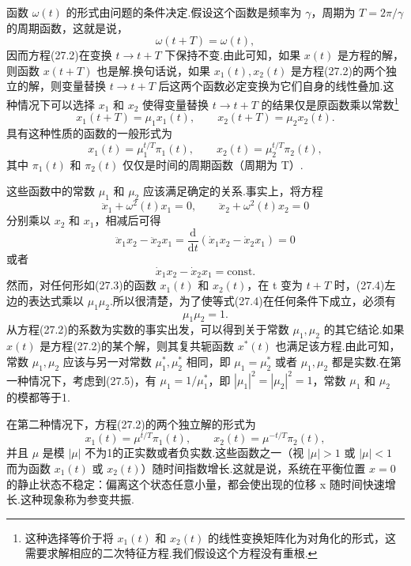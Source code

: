 函数 $\omega(t)$ 的形式由问题的条件决定.假设这个函数是频率为 $\gamma$，周期为 $T=2\pi/\gamma$ 的周期函数，这就是说，
\begin{equation*}
  \omega(t+T)=\omega(t),
\end{equation*}
因而方程(27.2)在变换 $t\to t+T$ 下保持不变.由此可知，如果 $x(t)$ 是方程的解，则函数 $x(t+T)$ 也是解.换句话说，如果 $x_1(t),x_2(t)$ 是方程(27.2)的两个独立的解，则变量替换 $t\to t+T$ 后这两个函数必定变换为它们自身的线性叠加.这种情况下可以选择 $x_1$ 和 $x_2$ 使得变量替换 $t\to t+T$ 的结果仅是原函数乘以常数\footnote{这种选择等价于将 $x_1(t)$ 和 $x_2(t)$ 的线性变换矩阵化为对角化的形式，这需要求解相应的二次特征方程.我们假设这个方程没有重根.}
\begin{equation*}
  x_1(t+T)=\mu_1x_1(t),\qquad
  x_2(t+T)=\mu_2x_2(t).
\end{equation*}
具有这种性质的函数的一般形式为
\begin{equation}
  x_1(t)=\mu_1^{t/T}\pi_1(t),\qquad
  x_2(t)=\mu_2^{t/T}\pi_2(t),
\end{equation}
其中 $\pi_1(t)$ 和 $\pi_2(t)$ 仅仅是时间的周期函数（周期为 T）.

这些函数中的常数 $\mu_1$ 和 $\mu_2$ 应该满足确定的关系.事实上，将方程
\begin{equation*}
  \ddot{x}_1+\omega^2(t)x_1=0,\qquad
  \ddot{x}_2+\omega^2(t)x_2=0
\end{equation*}
分别乘以 $x_2$ 和 $x_1$，相减后可得
\begin{equation*}
  \ddot{x}_1x_2-\ddot{x}_2x_1
  =\frac{\mathrm{d}}{\mathrm{d}t}\left(\dot{x}_1x_2-\dot{x}_2x_1\right)=0
\end{equation*}
或者
\begin{equation}
  \dot{x}_1x_2-\dot{x}_2x_1=\mathrm{const}.
\end{equation}
然而，对任何形如(27.3)的函数 $x_1(t)$ 和 $x_2(t)$，在 t 变为 $t+T$ 时，(27.4)左边的表达式乘以 $\mu_1\mu_2$.所以很清楚，为了使等式(27.4)在任何条件下成立，必须有
\begin{equation}
  \mu_1\mu_2=1.
\end{equation}
从方程(27.2)的系数为实数的事实出发，可以得到关于常数 $\mu_1,\mu_2$ 的其它结论.如果 $x(t)$ 是方程(27.2)的某个解，则其复共轭函数 $x^*(t)$ 也满足该方程.由此可知，常数 $\mu_1,\mu_2$ 应该与另一对常数 $\mu_1^*,\mu_2^*$ 相同，即 $\mu_1=\mu_2^*$ 或者 $\mu_1,\mu_2$ 都是实数.在第一种情况下，考虑到(27.5)，有 $\mu_1=1/\mu_1^*$，即 $|\mu_1|^2=|\mu_2|^2=1$，常数 $\mu_1$ 和 $\mu_2$ 的模都等于1.

在第二种情况下，方程(27.2)的两个独立解的形式为
\begin{equation}
  x_1(t)=\mu^{t/T}\pi_1(t),\qquad
  x_2(t)=\mu^{-t/T}\pi_2(t),
\end{equation}
并且 $\mu$ 是模 $|\mu|$ 不为1的正实数或者负实数.这些函数之一（视 $|\mu|>1$ 或 $|\mu|<1$ 而为函数 $x_1(t)$ 或 $x_2(t)$）随时间指数增长.这就是说，系统在平衡位置 $x=0$ 的静止状态不稳定：偏离这个状态任意小量，都会使出现的位移 x 随时间快速增长.这种现象称为参变共振.

